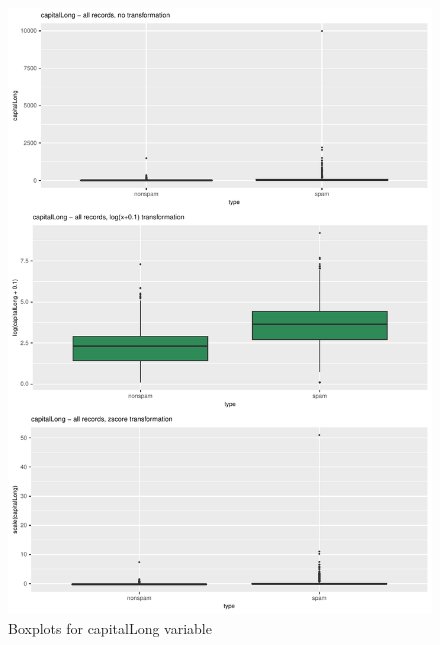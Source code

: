 \documentclass{article}\usepackage[]{graphicx}\usepackage[]{xcolor}
\makeatletter
\def\maxwidth{ %
  \ifdim\Gin@nat@width>\linewidth
    \linewidth
  \else
    \Gin@nat@width
  \fi
}
\newenvironment{knitrout}{}{} %
\makeatother
\begin{document}
\begin{knitrout}
\color{fgcolor}\begin{figure}[h]
\includegraphics[width=\maxwidth]{figure/capitalLongBox-1} \caption[\label{fig6} Boxplots for capitalLong variable]{\label{fig6} Boxplots for capitalLong variable}\label{fig:capitalLongBox}
\end{figure}

\end{knitrout}
\end{document}
